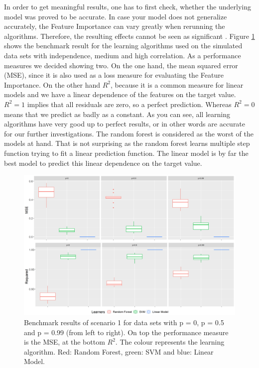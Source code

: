 \documentclass[]{krantz}
\begin{document}
In order to get meaningful results, one has to first check, whether the
underlying model was proved to be accurate. In case your model does not
generalize accurately, the Feature Importance can vary greatly when
rerunning the algorithms. Therefore, the resulting effects cannot be
seen as significant \citep{parr2018}. Figure \ref{fig:bmr01} shows the
benchmark result for the learning algorithms used on the simulated data
sets with independence, medium and high correlation. As a performance
measures we decided showing two. On the one hand, the mean squared error
(MSE), since it is also used as a loss measure for evaluating the
Feature Importance. On the other hand \(R^2\), because it is a common
measure for linear models and we have a linear dependence of the
features on the target value. \(R^2 = 1\) implies that all residuals are
zero, so a perfect prediction. Whereas \(R^2 = 0\) means that we predict
as badly as a constant. As you can see, all learning algorithms have
very good up to perfect results, or in other words are accurate for our
further investigations. The random forest is considered as the worst of
the models at hand. That is not surprising as the random forest learns
multiple step function trying to fit a linear prediction function. The
linear model is by far the best model to predict this linear dependence
on the target value.

\begin{figure}
\includegraphics[width=1\linewidth]{images/bmr01b} \caption{Benchmark results of scenario 1 for data sets with p = 0, p = 0.5 and p = 0.99 (from left to right). On top the performance measure is the MSE, at the bottom $R^2$. The colour represents the learning algorithm. Red: Random Forest, green: SVM and blue: Linear Model.}\label{fig:bmr01}
\end{figure}
\end{document}
